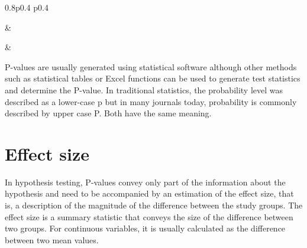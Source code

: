 \documentclass[
]{memoir}
\begin{document}
\begin{table}[ht]
\begin{centerbox}
\begin{threeparttable}
\begin{tabularx}{0.8\textwidth}{p{} p{}}
\hhline{}

 &
 \tabularnewline[-0.5pt]


\hhline{}

 &
 \tabularnewline[-0.5pt]


\end{tabularx}
\end{threeparttable}\par\end{centerbox}

\end{table}
 

P-values are usually generated using statistical software although other methods such as statistical tables or Excel functions can be used to generate test statistics and determine the P-value. In traditional statistics, the probability level was described as a lower-case p but in many journals today, probability is commonly described by upper case P. Both have the same meaning.

\hypertarget{effect-size}{%
\section{Effect size}\label{effect-size}}

In hypothesis testing, P-values convey only part of the information about the hypothesis and need to be accompanied by an estimation of the effect size, that is, a description of the magnitude of the difference between the study groups. The effect size is a summary statistic that conveys the size of the difference between two groups. For continuous variables, it is usually calculated as the difference between two mean values.
\end{document}
